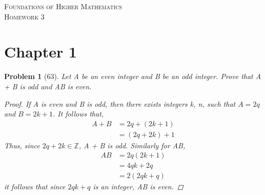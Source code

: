 \documentclass{article}
\theoremstyle{example}
\newtheorem{prob}{Problem}
\begin{document}
\begin{center}
\textsc{\Large Foundations of Higher Mathematics}\\[.3cm]
\textsc{\Large Homework 3}
\end{center}


\section*{Chapter 1}

\begin{prob}[63]
  Let A be an even integer and B be an odd integer. Prove that A + B is odd and AB is even.
\begin{proof}
    If A is even and B is odd, then there exists integers k, n, such that $A = 2q$ and $B = 2k + 1$. It follows that, 
    \begin{align*}
      A + B &= 2q + (2k + 1)\\
            &= (2q + 2k) + 1
    \end{align*}
    Thus, since $2q + 2k \in \mathbb{Z}$, A + B is odd. Similarly for AB,
    \begin{align*}
      AB &= 2q(2k+1)\\
      &= 4qk + 2q\\
      &= 2(2qk + q)
    \end{align*}
    it follows that since $2qk+q$ is an integer, AB is even.
  \end{proof}
\end{prob}
\end{document}
